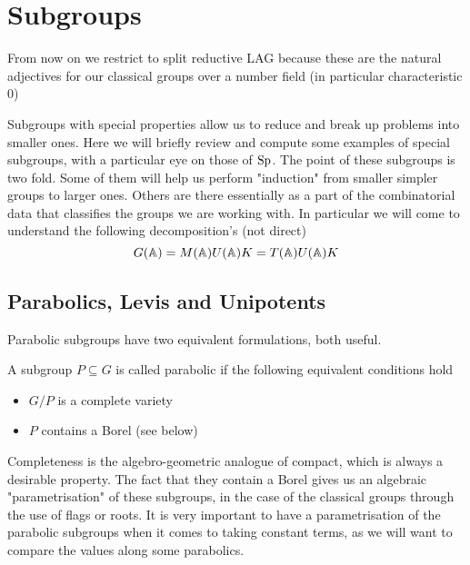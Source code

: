 \section{Subgroups}
From now on we restrict to split reductive LAG because these are the natural adjectives for our classical groups over a number field (in particular characteristic 0)

Subgroups with special properties allow us to reduce and break up problems into smaller ones. Here we will briefly review and compute some examples of special subgroups, with a particular eye on those of \(\operatorname{Sp}\). The point of these subgroups is two fold. Some of them will help us perform "induction" from smaller simpler groups to larger ones. Others are there essentially as a part of the combinatorial data that classifies the groups we are working with. In particular we will come to understand the following decomposition's (not direct)
\[G(\A) = M(\A)U(\A) K = T(\A)U(\A)K\]

\subsection{Parabolics, Levis and Unipotents}
Parabolic subgroups have two equivalent formulations, both useful.
\begin{definition}
    A subgroup \(P\subseteq G\) is called parabolic if the following equivalent conditions hold
    \begin{itemize}
        \item \(G/P\) is a complete variety
        \item \(P\) contains a Borel (see below)
    \end{itemize}
\end{definition}

Completeness is the algebro-geometric analogue of compact, which is always a desirable property. The fact that they contain a Borel gives us an algebraic "parametrisation" of these subgroups, in the case of the classical groups through the use of flags or roots. It is very important to have a parametrisation of the parabolic subgroups when it comes to taking constant terms, as we will want to compare the values along some parabolics.

